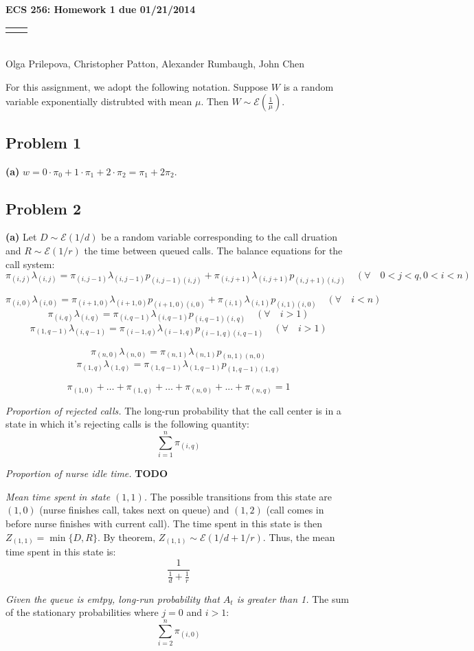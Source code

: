 \documentclass[12pt]{article}
\renewcommand{\title}[1]{\textbf{#1}\\}
\renewcommand{\line}{\begin{tabularx}{\textwidth}{X>{\raggedleft}X}\hline\\\end{tabularx}\\[-0.5cm]}
\begin{document}
\title{ECS 256: Homework 1 due 01/21/2014}
\line
Olga Prilepova, Christopher Patton, Alexander Rumbaugh, John Chen %


For this assignment, we adopt the following notation. Suppose $W$ is a random
variable exponentially distrubted with mean $\mu$. Then 
$W \sim \mathcal{E}(\frac{1}{\mu})$.

\subsection*{Problem 1}

\textbf{(a)} $w = 0 \cdot \pi_0 + 1 \cdot \pi_1 + 2 \cdot \pi_2 = \pi_1 + 2 \pi_2$. 

\subsection*{Problem 2}

\textbf{(a)} Let $D \sim \mathcal{E}(1/d)$ be a random variable corresponding 
to the call druation and $R \sim \mathcal{E}(1/r)$ the time between queued calls. 
The balance equations for the call system: 
$$ \pi_{(i,j)}\lambda_{(i,j)} = \pi_{(i,j-1)}\lambda_{(i,j-1)}p_{(i,j-1)(i,j)} + 
                                \pi_{(i,j+1)}\lambda_{(i,j+1)}p_{(i,j+1)(i,j)} 
  \quad (\forall \quad 0 < j < q, 0 < i < n)$$

$$ \pi_{(i,0)}\lambda_{(i,0)} = \pi_{(i+1,0)}\lambda_{(i+1,0)}p_{(i+1,0)(i,0)} + 
                                \pi_{(i,1)}\lambda_{(i,1)}p_{(i,1)(i,0)}
  \quad (\forall \quad i < n)$$
$$ \pi_{(i,q)}\lambda_{(i,q)} = \pi_{(i,q-1)}\lambda_{(i,q-1)}p_{(i,q-1)(i,q)}
  \quad (\forall \quad i > 1)$$
$$ \pi_{(1,q-1)}\lambda_{(i,q-1)} = \pi_{(i-1,q)}\lambda_{(i-1,q)}p_{(i-1,q)(i,q-1)} 
  \quad (\forall \quad i > 1)$$

$$ \pi_{(n,0)}\lambda_{(n,0)} = \pi_{(n,1)}\lambda_{(n,1)}p_{(n,1)(n,0)} $$ 
$$ \pi_{(1,q)}\lambda_{(1,q)} = \pi_{(1,q-1)}\lambda_{(1,q-1)}p_{(1,q-1)(1,q)} $$

$$ \pi_{(1,0)} + \dots + \pi_{(1,q)} + \dots + \pi_{(n,0)} + ... + \pi_{(n,q)} = 1 $$

\textit{Proportion of rejected calls.} The long-run probability that the call center
is in a state in which it's rejecting calls is the following quantity: 
$$ \sum_{i=1}^n{\pi_{(i,q)}}$$

\textit{Proportion of nurse idle time.} \textbf{TODO}

\textit{Mean time spent in state $(1,1)$.} The possible transitions from this state are 
$(1,0)$ (nurse finishes call, takes next on queue) and $(1,2)$ (call comes in 
before nurse finishes with current call). The time spent in this state is then 
$Z_{(1,1)} = \min \{ D, R \}$. By theorem, $Z_{(1,1)} \sim \mathcal{E}(1/d + 1/r)$. Thus,
the mean time spent in this state is: $$ \frac{1}{\frac{1}{d} + \frac{1}{r}} $$ 

\textit{Given the queue is emtpy, long-run probability that $A_t$ is greater than 1.} 
The sum of the stationary probabilities where $j=0$ and $i>1$: 
$$ \sum_{i=2}^n{\pi_{(i,0)}} $$
\end{document}
